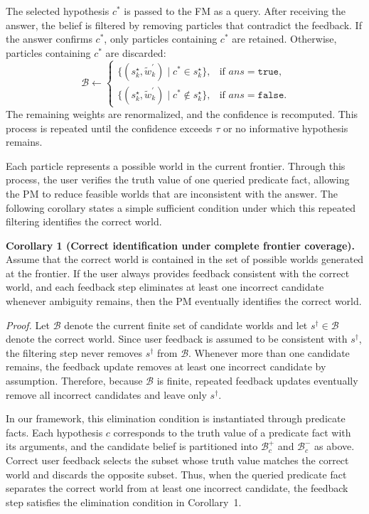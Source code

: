 The selected hypothesis $c^{*}$ is passed to the FM as a query. After receiving the answer, the belief is filtered by removing particles that contradict the feedback. If the answer confirms $c^{*}$, only particles containing $c^{*}$ are retained. Otherwise, particles containing $c^{*}$ are discarded:
\begin{equation}~\label{eq:filter}
\mathcal{B} \leftarrow
\begin{cases}
\{(s_k^{\star}, \tilde{w}_k^\prime) \mid c^{*} \in s_k^{\star}\}, & \text{if } ans = \texttt{true}, \\
\{(s_k^{\star}, \tilde{w}_k^\prime) \mid c^{*} \notin s_k^{\star}\}, & \text{if } ans = \texttt{false}.
\end{cases}
\end{equation}
The remaining weights are renormalized, and the confidence is recomputed. This process is repeated until the confidence exceeds $\tau$ or no informative hypothesis remains.

Each particle represents a possible world in the current frontier. Through this process, the user verifies the truth value of one queried predicate fact, allowing the PM to reduce feasible worlds that are inconsistent with the answer. The following corollary states a simple sufficient condition under which this repeated filtering identifies the correct world.

\noindent\textbf{Corollary 1 (Correct identification under complete frontier coverage).}
Assume that the correct world is contained in the set of possible worlds generated at the frontier. If the user always provides feedback consistent with the correct world, and each feedback step eliminates at least one incorrect candidate whenever ambiguity remains, then the PM eventually identifies the correct world.

\noindent\textit{Proof.}
Let $\mathcal{B}$ denote the current finite set of candidate worlds and let $s^{\dagger} \in \mathcal{B}$ denote the correct world. Since user feedback is assumed to be consistent with $s^{\dagger}$, the filtering step never removes $s^{\dagger}$ from $\mathcal{B}$. Whenever more than one candidate remains, the feedback update removes at least one incorrect candidate by assumption. Therefore, because $\mathcal{B}$ is finite, repeated feedback updates eventually remove all incorrect candidates and leave only $s^{\dagger}$. \qedm

In our framework, this elimination condition is instantiated through predicate facts. Each hypothesis $c$ corresponds to the truth value of a predicate fact with its arguments, and the candidate belief is partitioned into $\mathcal{B}^{+}_{c}$ and $\mathcal{B}^{-}_{c}$ as above. Correct user feedback selects the subset whose truth value matches the correct world and discards the opposite subset. Thus, when the queried predicate fact separates the correct world from at least one incorrect candidate, the feedback step satisfies the elimination condition in Corollary~1.




